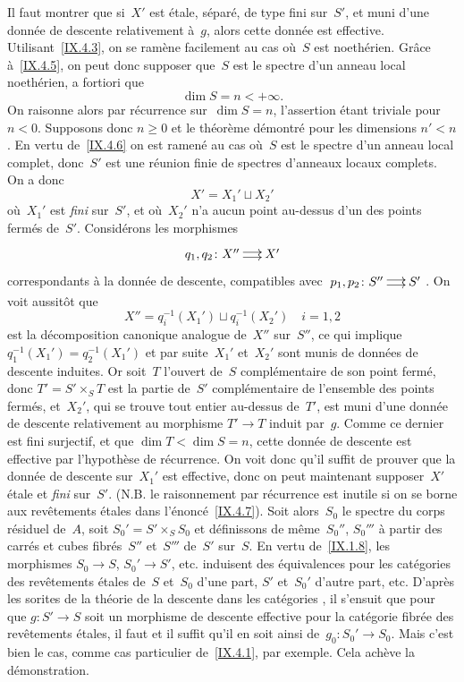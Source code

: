Il faut montrer que si~$X'$ est \'etale, s\'epar\'e, de type
fini sur~$S'$, et muni d'une donn\'ee de descente relativement
\`a~$g$, alors cette donn\'ee est effective.
Utilisant~\ref{IX.4.3}, on se ram\`ene facilement au cas o\`u~$S$
est noeth\'erien. Gr\^ace \`a~\ref{IX.4.5}, on peut donc
supposer que~$S$ est le spectre d'un anneau local noeth\'erien, a
fortiori que
$$
\dim S=n<+\infty.
$$
On raisonne alors par r\'ecurrence sur~$\dim S=n$, l'assertion
\'etant triviale pour $n<0$. Supposons donc $n\geq 0$ et le
th\'eor\`eme d\'emontr\'e pour les dimensions $n'<n$. En
vertu de~\ref{IX.4.6} on est ramen\'e au cas o\`u~$S$ est le
spectre d'un anneau local complet, donc~$S'$ est une r\'eunion finie
de spectres d'anneaux locaux complets. On a donc
$$
X'=X_1'\sqcup X_2'
$$
o\`u~$X_1'$ est \emph{fini} sur~$S'$, et o\`u~$X_2'$ n'a aucun
point au-dessus d'un des points ferm\'es
de~$S'$. Consid\'erons les morphismes
$$
\xymatrix@C=.5cm{{q_1,q_2\colon X''}\ar@<2pt>[r]\ar@<-2pt>[r]&{X'}}
$$
correspondants \`a la donn\'ee de descente, compatibles avec
$\xymatrix@C=.5cm{{p_1,p_2\colon S''}\ar@<2pt>[r]\ar@<-2pt>[r]&{S'}}$. On
voit aussit\^ot que
$$
X''=q_i^{-1}(X_1')\sqcup q_i^{-1}(X_2')\quad i=1,2
$$
est la d\'ecomposition canonique analogue de~$X''$ sur~$S''$, ce qui
implique $q_1^{-1}(X_1')= q_2^{-1}(X_1')$ et par suite~$X_1'$ et~$X_2'$
sont munis de donn\'ees de descente induites. Or soit~$T$ l'ouvert
de~$S$ compl\'ementaire de son point ferm\'e, donc $T'=S'\times_S
T$ est la partie de~$S'$ compl\'ementaire de l'ensemble des points
ferm\'es, et~$X_2'$, qui se trouve tout entier au-dessus de~$T'$,
est muni d'une donn\'ee de descente relativement au morphisme $T'\to
T$ induit par~$g$. Comme ce dernier est fini surjectif, et que $\dim
T<\dim S=n$, cette donn\'ee de descente est effective par
l'hypoth\`ese de r\'ecurrence. On voit donc qu'il suffit de
prouver que la donn\'ee de descente sur~$X_1'$ est effective, donc
on peut maintenant supposer~$X'$ \'etale et \emph{fini} sur~$S'$.
(N.B. le raisonnement par r\'ecurrence est inutile si on se borne
aux rev\^etements \'etales dans l'\'enonc\'e~\ref{IX.4.7}).
Soit alors~$S_0$ le spectre du corps r\'esiduel de~$A$, soit
$S_0'=S'\times_S S_0$ et d\'efinissons de m\^eme~$S_0''$, $S_0'''$
\`a partir des carr\'es et cubes fibr\'es~$S''$ et~$S'''$
de~$S'$ sur~$S$. En vertu de~\ref{IX.1.8}, les morphismes $S_0\to S$,
$S_0'\to S'$, etc. induisent des \'equivalences pour les
cat\'egories des rev\^etements \'etales de~$S$ et~$S_0$ d'une
part, $S'$ et~$S_0'$ d'autre part, etc. D'apr\`es les sorites de
la th\'eorie de la descente dans les cat\'egories \cite{IX.D}, il s'ensuit
que pour que $g\colon S'\to S$ soit un morphisme de descente effective
pour la cat\'egorie fibr\'ee des rev\^etements \'etales, il
faut et il suffit qu'il en soit ainsi de~$g_0\colon S_0'\to S_0$.
Mais c'est bien le cas, comme cas particulier de~\ref{IX.4.1}, par
exemple. Cela ach\`eve la d\'emonstration.

